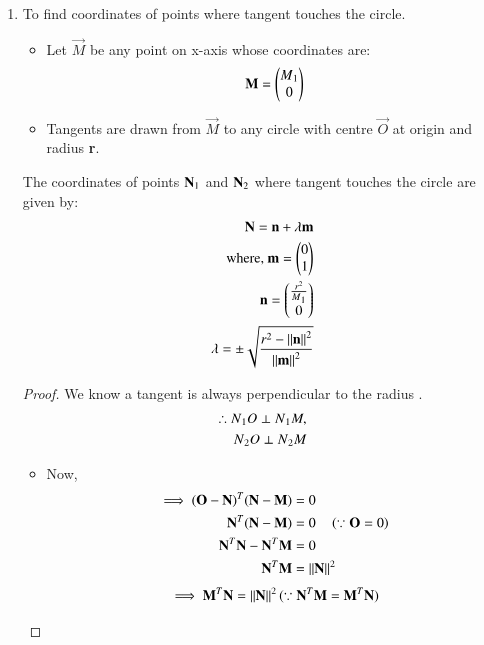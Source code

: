 \documentclass[journal,12pt,twocolumn]{IEEEtran}
\begin{document}
\begin{enumerate}
    \item To find coordinates of points where tangent touches the circle.
\begin{itemize}
    \item Let $\vec{M}$ be any point on x-axis whose coordinates are:
    \begin{align}
    \vec{M} =\myvec{M\textsubscript{1} \\0} \label{eq1}
    \end{align}
    \item Tangents are drawn from $\vec{M}$ to any circle with centre $\vec{O}$ at origin and radius \textbf{r}.
\end{itemize}
\begin{lemma}
\label{lemma}
The coordinates of points $\vec{N\textsubscript{1}}$ and $\vec{N\textsubscript{2}}$ where tangent touches the circle are given by:
\begin{align}
\vec{N}=\vec{n}+\lambda \vec{m} \label{eq2}
\\
\text{where, }\vec{m}=\myvec{0\\1} 
\\
\vec{n}=\myvec{\frac{r^2}{M\textsubscript{1}}\\0}
\\
\lambda = \pm\sqrt{\frac{r^2-\norm{\vec{n}}^2}{\norm{\vec{m}}^2}}
\end{align}
\end{lemma}
\begin{proof}
We know a tangent is always perpendicular to the radius .
\begin{align}
\therefore N\textsubscript{1}O \perp N\textsubscript{1}M, 
\\
N\textsubscript{2}O \perp N\textsubscript{2}M
\end{align}
\begin{itemize}
\item Now,
\begin{align}
 \implies (\vec{O}-\vec{N})^T (\vec{N}-\vec{M}) &= 0
 \\
 \vec{N}^T(\vec{N}-\vec{M})&= 0 \quad \brak{\because \vec{O}=0}
 \\
  \vec{N}^T \vec{N} - \vec{N}^T \vec{M} &= 0  
  \\
   \vec{N}^T \vec{M} &=\norm{\vec{N}}^2
  \end{align}
 \begin{align}
  \implies\vec{M}^T \vec{N} =\norm{\vec{N}}^2 (\because \vec{N}^T \vec{M}=\vec{M}^T \vec{N}) 
 \end{align}

\end{itemize}
\end{proof}
\end{enumerate}
\end{document}
